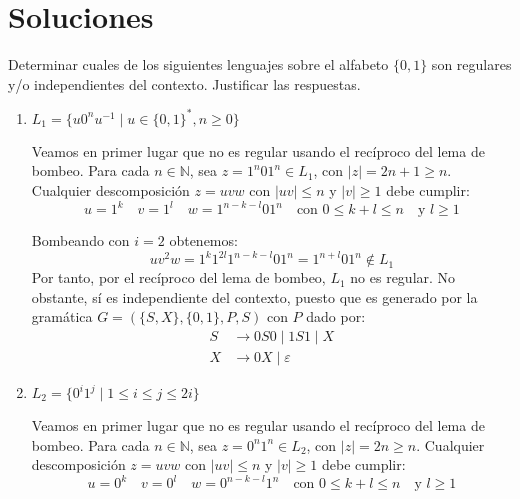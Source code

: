 \documentclass[12pt]{article}
\begin{document}
    \newpage
    \setcounter{ejercicio}{0}
    \section*{Soluciones}
    \begin{ejercicio}[2.5 puntos]
        Determinar cuales de los siguientes lenguajes sobre el alfabeto $\{0, 1\}$ son regulares y/o independientes del contexto.
        Justificar las respuestas.
        \begin{enumerate}
            \item $L_1 = \{u0^n u^{-1} \mid u \in \{0, 1\}^*, n \geq 0\}$
            
            Veamos en primer lugar que no es regular usando el recíproco del lema de bombeo. Para cada $n\in \mathbb{N}$, sea $z=1^n01^n\in L_1$, con $|z|=2n+1\geq n$. Cualquier descomposición $z=uvw$ con $|uv|\leq n$ y $|v|\geq 1$ debe cumplir:
            \begin{equation*}
                u=1^k \quad v=1^l \quad w=1^{n-k-l}01^n \quad \text{con } 0\leq k+l\leq n \quad \text{y } l\geq 1
            \end{equation*}

            Bombeando con $i=2$ obtenemos:
            \begin{equation*}
                uv^2w=1^k1^{2l}1^{n-k-l}01^n=1^{n+l}01^n\notin L_1
            \end{equation*}
            Por tanto, por el recíproco del lema de bombeo, $L_1$ no es regular. No obstante, sí es independiente del contexto, puesto que es generado por la gramática $G=(\{S,X\},\{0,1\},P,S)$ con $P$ dado por:
            \begin{align*}
                S&\to 0S0\mid 1S1\mid X\\
                X&\to 0X\mid \varepsilon
            \end{align*}

            \item $L_2 = \{0^i 1^j \mid 1 \leq i \leq j \leq 2i\}$
            
            Veamos en primer lugar que no es regular usando el recíproco del lema de bombeo. Para cada $n\in \mathbb{N}$, sea $z=0^n1^{n}\in L_2$, con $|z|=2n\geq n$. Cualquier descomposición $z=uvw$ con $|uv|\leq n$ y $|v|\geq 1$ debe cumplir:
            \begin{equation*}
                u=0^k \quad v=0^l \quad w=0^{n-k-l}1^n \quad \text{con } 0\leq k+l\leq n \quad \text{y } l\geq 1
            \end{equation*}


\end{enumerate}
\end{ejercicio}
\end{document}
